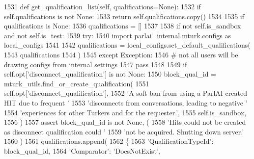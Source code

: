 \begin{DoxyCode}
1531     \textcolor{keyword}{def }get\_qualification\_list(self, qualifications=None):
1532         \textcolor{keywordflow}{if} self.qualifications \textcolor{keywordflow}{is} \textcolor{keywordflow}{not} \textcolor{keywordtype}{None}:
1533             \textcolor{keywordflow}{return} self.qualifications.copy()
1534 
1535         \textcolor{keywordflow}{if} qualifications \textcolor{keywordflow}{is} \textcolor{keywordtype}{None}:
1536             qualifications = []
1537 
1538         \textcolor{keywordflow}{if} \textcolor{keywordflow}{not} self.is\_sandbox \textcolor{keywordflow}{and} \textcolor{keywordflow}{not} self.is\_test:
1539             \textcolor{keywordflow}{try}:
1540                 \textcolor{keyword}{import} parlai\_internal.mturk.configs \textcolor{keyword}{as} local\_configs
1541 
1542                 qualifications = local\_configs.set\_default\_qualifications(
1543                     qualifications
1544                 )
1545             \textcolor{keywordflow}{except} Exception:
1546                 \textcolor{comment}{# not all users will be drawing configs from internal settings}
1547                 \textcolor{keywordflow}{pass}
1548 
1549         \textcolor{keywordflow}{if} self.opt[\textcolor{stringliteral}{'disconnect\_qualification'}] \textcolor{keywordflow}{is} \textcolor{keywordflow}{not} \textcolor{keywordtype}{None}:
1550             block\_qual\_id = mturk\_utils.find\_or\_create\_qualification(
1551                 self.opt[\textcolor{stringliteral}{'disconnect\_qualification'}],
1552                 \textcolor{stringliteral}{'A soft ban from using a ParlAI-created HIT due to frequent '}
1553                 \textcolor{stringliteral}{'disconnects from conversations, leading to negative '}
1554                 \textcolor{stringliteral}{'experiences for other Turkers and for the requester.'},
1555                 self.is\_sandbox,
1556             )
1557             \textcolor{keyword}{assert} block\_qual\_id \textcolor{keywordflow}{is} \textcolor{keywordflow}{not} \textcolor{keywordtype}{None}, (
1558                 \textcolor{stringliteral}{'Hits could not be created as disconnect qualification could '}
1559                 \textcolor{stringliteral}{'not be acquired. Shutting down server.'}
1560             )
1561             qualifications.append(
1562                 \{
1563                     \textcolor{stringliteral}{'QualificationTypeId'}: block\_qual\_id,
1564                     \textcolor{stringliteral}{'Comparator'}: \textcolor{stringliteral}{'DoesNotExist'},

\end{DoxyCode}
